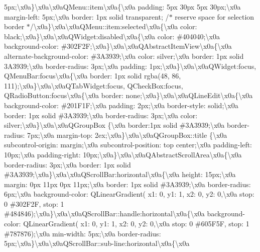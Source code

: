 5px;\textbackslash{}x0a\}\textbackslash{}x0a\textbackslash{}x0a\+Q\+Menu\+::item\textbackslash{}x0a\{\textbackslash{}x0a padding\+: 5px 30px 5px 30px;\textbackslash{}x0a margin-\/left\+: 5px;\textbackslash{}x0a border\+: 1px solid transparent; /$\ast$ reserve space for selection border $\ast$/\textbackslash{}x0a\}\textbackslash{}x0a\textbackslash{}x0a\+Q\+Menu\+::item\+:selected\textbackslash{}x0a\{\textbackslash{}x0a color\+: black;\textbackslash{}x0a\}\textbackslash{}x0a\textbackslash{}x0a\+Q\+Widget\+:disabled\textbackslash{}x0a\{\textbackslash{}x0a color\+: \#404040;\textbackslash{}x0a background-\/color\+: \#302\+F2\+F;\textbackslash{}x0a\}\textbackslash{}x0a\textbackslash{}x0a\+Q\+Abstract\+Item\+View\textbackslash{}x0a\{\textbackslash{}x0a alternate-\/background-\/color\+: \#3\+A3939;\textbackslash{}x0a color\+: silver;\textbackslash{}x0a border\+: 1px solid 3\+A3939;\textbackslash{}x0a border-\/radius\+: 3px;\textbackslash{}x0a padding\+: 1px;\textbackslash{}x0a\}\textbackslash{}x0a\textbackslash{}x0a\+Q\+Widget\+:focus, Q\+Menu\+Bar\+:focus\textbackslash{}x0a\{\textbackslash{}x0a border\+: 1px solid rgba(48, 86, 111);\textbackslash{}x0a\}\textbackslash{}x0a\textbackslash{}x0a\+Q\+Tab\+Widget\+:focus, Q\+Check\+Box\+:focus, Q\+Radio\+Button\+:focus\textbackslash{}x0a\{\textbackslash{}x0a border\+: none;\textbackslash{}x0a\}\textbackslash{}x0a\textbackslash{}x0a\+Q\+Line\+Edit\textbackslash{}x0a\{\textbackslash{}x0a background-\/color\+: \#201\+F1\+F;\textbackslash{}x0a padding\+: 2px;\textbackslash{}x0a border-\/style\+: solid;\textbackslash{}x0a border\+: 1px solid \#3\+A3939;\textbackslash{}x0a border-\/radius\+: 3px;\textbackslash{}x0a color\+: silver;\textbackslash{}x0a\}\textbackslash{}x0a\textbackslash{}x0a\+Q\+Group\+Box \{\textbackslash{}x0a border\+:1px solid \#3\+A3939;\textbackslash{}x0a border-\/radius\+: 7px;\textbackslash{}x0a margin-\/top\+: 2ex;\textbackslash{}x0a\}\textbackslash{}x0a\textbackslash{}x0a\+Q\+Group\+Box\+::title \{\textbackslash{}x0a subcontrol-\/origin\+: margin;\textbackslash{}x0a subcontrol-\/position\+: top center;\textbackslash{}x0a padding-\/left\+: 10px;\textbackslash{}x0a padding-\/right\+: 10px;\textbackslash{}x0a\}\textbackslash{}x0a\textbackslash{}x0a\+Q\+Abstract\+Scroll\+Area\textbackslash{}x0a\{\textbackslash{}x0a border-\/radius\+: 3px;\textbackslash{}x0a border\+: 1px solid \#3\+A3939;\textbackslash{}x0a\}\textbackslash{}x0a\textbackslash{}x0a\+Q\+Scroll\+Bar\+:horizontal\textbackslash{}x0a\{\textbackslash{}x0a height\+: 15px;\textbackslash{}x0a margin\+: 0px 11px 0px 11px;\textbackslash{}x0a border\+: 1px solid \#3\+A3939;\textbackslash{}x0a border-\/radius\+: 6px;\textbackslash{}x0a background-\/color\+: Q\+Linear\+Gradient( x1\+: 0, y1\+: 1, x2\+: 0, y2\+: 0,\textbackslash{}x0a stop\+: 0 \#302\+F2\+F, stop\+: 1 \#484846);\textbackslash{}x0a\}\textbackslash{}x0a\textbackslash{}x0a\+Q\+Scroll\+Bar\+::handle\+:horizontal\textbackslash{}x0a\{\textbackslash{}x0a background-\/color\+: Q\+Linear\+Gradient( x1\+: 0, y1\+: 1, x2\+: 0, y2\+: 0,\textbackslash{}x0a stop\+: 0 \#605\+F5\+F, stop\+: 1 \#787876);\textbackslash{}x0a min-\/width\+: 5px;\textbackslash{}x0a border-\/radius\+: 5px;\textbackslash{}x0a\}\textbackslash{}x0a\textbackslash{}x0a\+Q\+Scroll\+Bar\+::sub-\/line\+:horizontal\textbackslash{}x0a\{\textbackslash{}x0a 